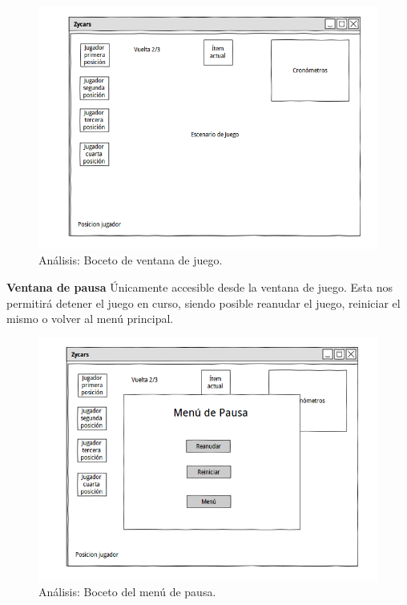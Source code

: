 \begin{description}
        \begin{figure}[H]
          \label{diagrama_casos_uso}
          \begin{center}
            \includegraphics[scale=0.42]{imagenes/analisis/boceto_juego.png}
          \end{center}
          \caption{Análisis: Boceto de ventana de juego.}
        \end{figure}
    
    \item \textbf{Ventana de pausa} Únicamente accesible desde la ventana de juego. Esta nos permitirá detener el juego en curso, 
    siendo posible reanudar el juego, reiniciar el mismo o volver al menú principal.

        \begin{figure}[H]
          \label{diagrama_casos_uso}
          \begin{center}
            \includegraphics[scale=0.42]{imagenes/analisis/boceto_pausa.png}
          \end{center}
          \caption{Análisis: Boceto del menú de pausa.}
        \end{figure}
    

\end{description}
